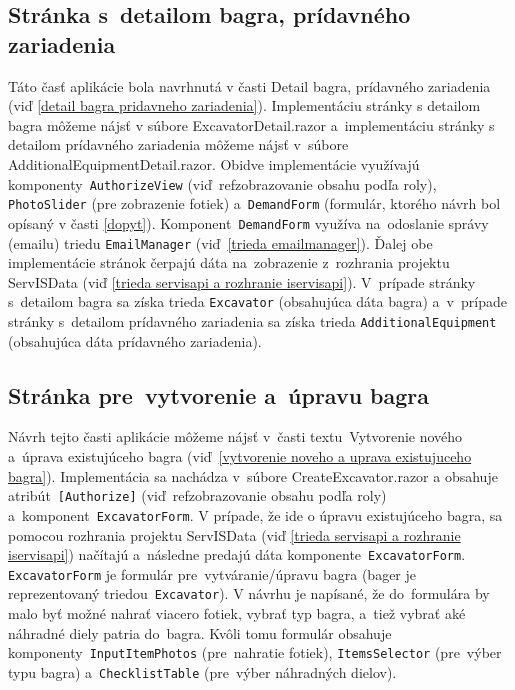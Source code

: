 \subsection{Stránka s~detailom bagra, prídavného zariadenia}

Táto časť aplikácie bola navrhnutá v časti Detail bagra, prídavného zariadenia (viď \ref{detail bagra pridavneho zariadenia}). Implementáciu stránky s detailom bagra môžeme nájsť v súbore ExcavatorDetail.razor a~implementáciu stránky s detailom prídavného zariadenia môžeme nájsť v~súbore AdditionalEquipmentDetail.razor. Obidve implementácie využívajú komponenty~\verb|AuthorizeView| (viď~ref{zobrazovanie obsahu podľa roly}), \verb|PhotoSlider| (pre zobrazenie fotiek) a~\verb|DemandForm| (formulár, ktorého návrh bol opísaný v časti \ref{dopyt}). Komponent~\verb|DemandForm| využíva na~odoslanie správy (emailu) triedu \verb|EmailManager| (viď~\ref{trieda emailmanager}). Ďalej obe implementácie stránok čerpajú dáta na~zobrazenie z~rozhrania projektu ServISData (viď \ref{trieda servisapi a rozhranie iservisapi}). V~prípade stránky s~detailom bagra sa získa trieda \verb|Excavator| (obsahujúca dáta bagra) a~v~prípade stránky s~detailom prídavného zariadenia sa získa trieda \verb|AdditionalEquipment| (obsahujúca dáta prídavného zariadenia).

\subsection{Stránka pre~vytvorenie a~úpravu bagra}
\label{stranka pre vytvorenie a upravu bagra}

Návrh tejto časti aplikácie môžeme nájsť v~časti textu~Vytvorenie nového a~úprava existujúceho bagra (viď~\ref{vytvorenie noveho a uprava existujuceho bagra}). Implementácia sa nachádza v~súbore CreateExcavator.razor a obsahuje atribút~\verb|[Authorize]| (viď~ref{zobrazovanie obsahu podľa roly}) a~komponent~\verb|ExcavatorForm|. V prípade, že ide o úpravu existujúceho bagra, sa pomocou rozhrania projektu ServISData (viď \ref{trieda servisapi a rozhranie iservisapi}) načítajú a~následne predajú dáta komponente~\verb|ExcavatorForm|. \verb|ExcavatorForm| je formulár pre~vytváranie/úpravu bagra (bager je reprezentovaný triedou~\verb|Excavator|). V návrhu je napísané, že do~formulára by malo byť možné nahrať viacero fotiek, vybrať typ bagra, a~tiež vybrať aké náhradné diely patria do~bagra. Kvôli tomu formulár obsahuje komponenty~\verb|InputItemPhotos| (pre~nahratie fotiek), \verb|ItemsSelector| (pre~výber typu bagra) a~\verb|ChecklistTable| (pre~výber náhradných dielov).

